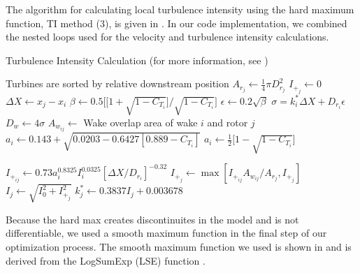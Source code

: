 \documentclass[conf]{new-aiaa}
\begin{document}
The algorithm for calculating local turbulence intensity using the hard maximum function, TI method (3), is given in . In our code implementation, we combined the nested loops used for the velocity and turbulence intensity calculations. 
%
\begin{algorithm}[htpb!]
	\caption{Turbulence Intensity Calculation (for more information, see \cite{niayifar2016})}
   \label{alg:ti}
   \begin{algorithmic}
   \Ensure Turbines are sorted by relative downstream position
      
    \State $A_{r_j} \gets \frac{1}{4}\pi D_{r_j}^2$ 
    \State $I_{+_j} \gets 0$
          
         	\State $\Delta X \gets x_j - x_i$ 
               \State $\beta \gets 0.5\Big[\Big[1+\sqrt{1-C_{T_i}}\Big]/\sqrt{1-C_{T_i}}\Big]$
               \State $\epsilon \gets 0.2 \sqrt{\beta}$
               \State $\sigma = k_i^*\Delta X+D_{r_i}\epsilon$
               \State $D_w \gets 4\sigma$
               \State $A_{w_{ij}} \gets$ Wake overlap area of wake $i$ and rotor $j$ 
                    \State $a_i \gets 0.143 + \sqrt{0.0203-0.6427[0.889 - C_{T_i}]}$ 
               \Else
                   \State $a_i \gets  \frac{1}{2}\Big[1-\sqrt{1-C_{T_i}}\Big]$
               \EndIf
               
               \State $I_{+_{ij}} \gets 0.73 a_{i}^{0.8325} I_i^{0.0325} [\Delta X/D_{r_i}]^{-0.32}$
               \State $I_{+_j} \gets \max{[I_{+_{ij}}A_{w_{ij}}/A_{r_j}, I_{+_j}]}$ 
        	\EndIf
        \EndFor
        \State $I_j \gets \sqrt{I_{0}^2 + I_{+_j}^2}$ 
        \State $k_j^* \gets 0.3837I_j+0.003678 $ 
     \EndFor
   \end{algorithmic}    
\end{algorithm}
%
Because the hard max creates discontinuites in the model and is not differentiable, we used a smooth maximum function in the final step of our optimization process. The smooth maximum function we used is shown in  and is derived from the LogSumExp (LSE) function \cite{cook2010-softmaximum}.
\end{document}
